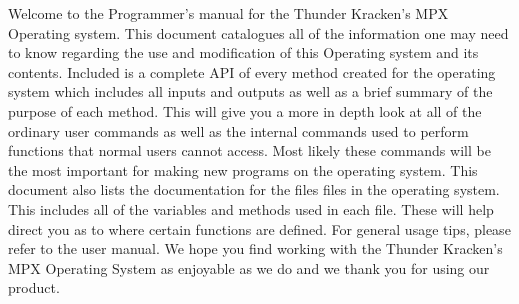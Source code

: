Welcome to the Programmer’s manual for the Thunder Kracken’s M\+PX Operating system. This document catalogues all of the information one may need to know regarding the use and modification of this Operating system and its contents. Included is a complete A\+PI of every method created for the operating system which includes all inputs and outputs as well as a brief summary of the purpose of each method. This will give you a more in depth look at all of the ordinary user commands as well as the internal commands used to perform functions that normal users cannot access. Most likely these commands will be the most important for making new programs on the operating system. This document also lists the documentation for the files files in the operating system. This includes all of the variables and methods used in each file. These will help direct you as to where certain functions are defined. For general usage tips, please refer to the user manual. We hope you find working with the Thunder Kracken’s M\+PX Operating System as enjoyable as we do and we thank you for using our product. 
